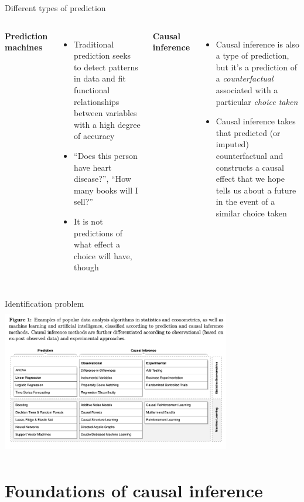 \documentclass{beamer}
\begin{document}
\begin{frame}{Different types of prediction}

  \begin{columns}
    \centering
    \textbf{Prediction machines}
    \begin{itemize}
      \item Traditional prediction seeks to detect patterns in data and fit functional relationships between variables with a high degree of accuracy
      \item ``Does this person have heart disease?'', ``How many books will I sell?''
      \item It is not predictions of what effect a choice will have, though
    \end{itemize}
    \centering
    \textbf{Causal inference}
    \begin{itemize}
      \item Causal inference is also a type of prediction, but it's a prediction of a \emph{counterfactual} associated with a particular \emph{choice taken}
      \item Causal inference takes that predicted (or imputed) counterfactual and constructs a causal effect that we hope tells us about a future in the event of a similar choice taken
    \end{itemize}
  \end{columns}
\end{frame}


\begin{frame}{Identification problem}
  \centering
  \includegraphics[scale=0.5,height=6.5cm, width=10cm]{./lecture_includes/prediction_causality.png}
\end{frame}



\section{Foundations of causal inference}
\end{document}
